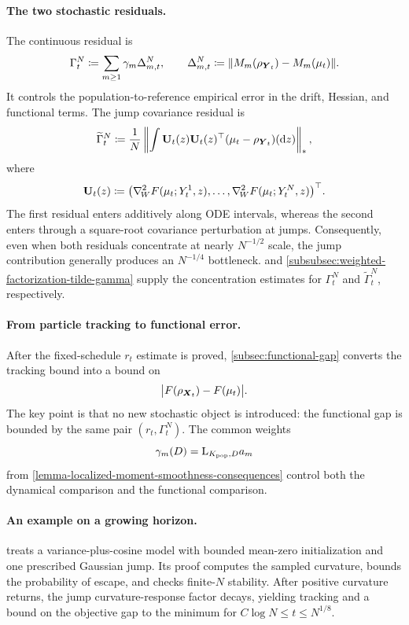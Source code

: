 \paragraph{The two stochastic residuals.}
The continuous residual is
\[
    \Gamma_t^N
    \coloneq
    \sum_{m\ge1}\gamma_m\Delta_{m,t}^N,
    \qquad
    \Delta_{m,t}^N
    \coloneq
    \norm{M_m(\rho_{\boldsymbol{Y}_t})-M_m(\mu_t)} .
\]
It controls the population-to-reference empirical error in the drift, Hessian,
and functional terms.  The jump covariance residual is
\[
    \widetilde\Gamma_t^N
    \coloneq
    \frac1N
    \left\|
    \int
    \mathbf U_t(z)\mathbf U_t(z)^\top
    (\mu_t-\rho_{\boldsymbol{Y}_t})(\dd z)
    \right\|_* ,
\]
where
\[
    \mathbf U_t(z)
    \coloneq
    \bigl(
    \nabla^{2}_{\!W} F(\mu_t;Y_t^1,z),\ldots,
    \nabla^{2}_{\!W} F(\mu_t;Y_t^N,z)
    \bigr)^\top .
\]
The first residual enters additively along ODE intervals, whereas the second
enters through a square-root covariance perturbation at jumps.  Consequently,
even when both residuals concentrate at nearly $N^{-1/2}$ scale, the jump
contribution generally produces an $N^{-1/4}$ bottleneck.
 and
\cref{subsubsec:weighted-factorization-tilde-gamma} supply the concentration
estimates for $\Gamma_t^N$ and $\widetilde\Gamma_t^N$, respectively.

\paragraph{From particle tracking to functional error.}
After the fixed-schedule $r_t$ estimate is proved,
\cref{subsec:functional-gap} converts the
tracking bound into a bound on
\[
    \bigl|F(\rho_{\boldsymbol{X}_t})-F(\mu_t)\bigr| .
\]
The key point is that no new stochastic object is introduced: the functional gap
is bounded by the same pair $(r_t,\Gamma_t^N)$. The common weights
\[
 \gamma_m(D)=\mathrm L_{K_{\rm pop},D}a_m
\]
from \cref{lemma-localized-moment-smoothness-consequences} control both
the dynamical comparison and the functional comparison.

\paragraph{An example on a growing horizon.}
 treats a variance-plus-cosine model
with bounded mean-zero initialization and one prescribed Gaussian jump.
Its proof computes the sampled curvature, bounds the probability of
escape, and checks finite-$N$ stability. After positive curvature returns,
the jump curvature-response factor decays, yielding tracking and a bound on the objective
gap to the minimum for $C\log N\le t\le N^{1/8}$.

